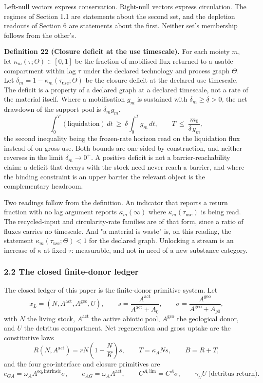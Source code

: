 \documentclass[11pt]{article}
\begin{document}
Left-null vectors express conservation. Right-null vectors express circulation. The regimes of Section 1.1 are statements about the second set, and the depletion readouts of Section 6 are statements about the first. Neither set's membership follows from the other's.

\textbf{Definition 22 (Closure deficit at the use timescale).} For each moiety \(m\), let \(\kappa_m(\tau;\Theta)\in[0,1]\) be the fraction of mobilised flux returned to a usable compartment within lag \(\tau\) under the declared technology and process graph \(\Theta\). Let \(\delta_m=1-\kappa_m(\tau_{\mathrm{use}};\Theta)\) be the closure deficit at the declared use timescale. The deficit is a property of a declared graph at a declared timescale, not a rate of the material itself. Where a mobilisation \(g_m\) is sustained with \(\delta_m\ge\underline\delta>0\), the net drawdown of the support pool is \(\delta_mg_m\). \[ \int_0^T(\text{liquidation})\,dt\ \ge\ \underline\delta\int_0^Tg_m\,dt, \qquad T\ \le\ \frac{m_0}{\underline\delta\,g_m}, \] the second inequality being the frozen-rate horizon read on the liquidation flux instead of on gross use. Both bounds are one-sided by construction, and neither reverses in the limit \(\delta_m\to0^+\). A positive deficit is not a barrier-reachability claim: a deficit that decays with the stock need never reach a barrier, and where the binding constraint is an upper barrier the relevant object is the complementary headroom.

Two readings follow from the definition. An indicator that reports a return fraction with no lag argument reports \(\kappa_m(\infty)\) where \(\kappa_m(\tau_{\mathrm{use}})\) is being read. The recycled-input and circularity-rate families are of that form, since a ratio of fluxes carries no timescale. And "a material is waste" is, on this reading, the statement \(\kappa_m(\tau_{\mathrm{use}};\Theta)<1\) for the declared graph. Unlocking a stream is an increase of \(\kappa\) at fixed \(\tau\): measurable, and not in need of a new substance category.


\subsubsection{2.2 The closed finite-donor
ledger}\label{the-closed-finite-donor-ledger}

The closed ledger of this paper is the finite-donor primitive system. Let \[x_L = (N, A^{\mathrm{act}}, A^{\mathrm{geo}}, U), \qquad s = \frac{A^{\mathrm{act}}}{A^{\mathrm{act}} + A_0}, \qquad \sigma = \frac{A^{\mathrm{geo}}}{A^{\mathrm{geo}} + A_{g0}},\] with \(N\) the living stock, \(A^{\mathrm{act}}\) the active abiotic pool, \(A^{\mathrm{geo}}\) the geological donor, and \(U\) the detritus compartment. Net regeneration and gross uptake are the constitutive laws \[R(N, A^{\mathrm{act}}) = rN\left(1 - \frac{N}{K}\right)s, \qquad T = \kappa_A N s, \qquad B = R + T,\] and the four geo-interface and closure primitives are \[e_{GA} = \omega_A A^{\mathrm{eq,intrinsic}} \sigma, \qquad e_{AG} = \omega_A A^{\mathrm{act}}, \qquad C^{A,\mathrm{lim}} = C^A \sigma, \qquad \gamma_U U \ \text{(detritus return)}.\]
\end{document}
